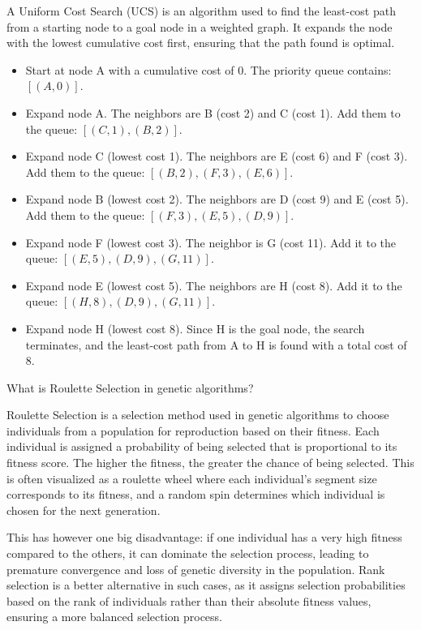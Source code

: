 \documentclass[12pt]{article}
\begin{document}
\begin{ejercicio}
        A Uniform Cost Search (UCS) is an algorithm used to find the least-cost path from a starting node to a goal node in a weighted graph. It expands the node with the lowest cumulative cost first, ensuring that the path found is optimal.
        \begin{itemize}
            \item Start at node A with a cumulative cost of 0. The priority queue contains: $[(A, 0)]$.
            \item Expand node A. The neighbors are B (cost 2) and C (cost 1). Add them to the queue: $[(C, 1), (B, 2)]$.
            \item Expand node C (lowest cost 1). The neighbors are E (cost 6) and F (cost 3). Add them to the queue: $[(B, 2), (F, 3), (E, 6)]$.
            \item Expand node B (lowest cost 2). The neighbors are D (cost 9) and E (cost 5). Add them to the queue: $[(F, 3), (E, 5), (D, 9)]$.
            \item Expand node F (lowest cost 3). The neighbor is G (cost 11). Add it to the queue: $[(E, 5), (D, 9), (G, 11)]$.
            \item Expand node E (lowest cost 5). The neighbors are H (cost 8). Add it to the queue: $[(H, 8), (D, 9), (G, 11)]$.
            \item Expand node H (lowest cost 8). Since H is the goal node, the search terminates, and the least-cost path from A to H is found with a total cost of 8.
        \end{itemize}
    \end{ejercicio}

    \begin{ejercicio}
        What is Roulette Selection in genetic algorithms?

        Roulette Selection is a selection method used in genetic algorithms to choose individuals from a population for reproduction based on their fitness. Each individual is assigned a probability of being selected that is proportional to its fitness score. The higher the fitness, the greater the chance of being selected. This is often visualized as a roulette wheel where each individual's segment size corresponds to its fitness, and a random spin determines which individual is chosen for the next generation.
        
        This has however one big disadvantage: if one individual has a very high fitness compared to the others, it can dominate the selection process, leading to premature convergence and loss of genetic diversity in the population. Rank selection is a better alternative in such cases, as it assigns selection probabilities based on the rank of individuals rather than their absolute fitness values, ensuring a more balanced selection process.
    \end{ejercicio}
\end{document}
